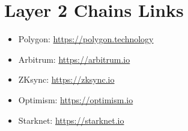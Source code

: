 \chapter{Layer 2 Chains Links}
\label{chap:layer2links}

\begin{itemize}
    \item Polygon: \url{https://polygon.technology}
    \item Arbitrum: \url{https://arbitrum.io}
    \item ZKsync: \url{https://zksync.io}
    \item Optimism: \url{https://optimism.io}
    \item Starknet: \url{https://starknet.io}
\end{itemize}
